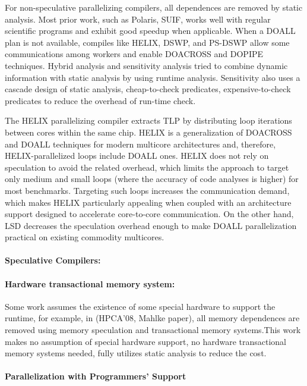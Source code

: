 For non-speculative parallelizing compilers, all dependences are removed by
static analysis. Most prior work, such as Polaris, SUIF, works well with regular
scientific programs and exhibit good speedup when applicable. When a DOALL plan
is not available, compiles like HELIX, DSWP, and PS-DSWP allow some
communications among workers and enable DOACROSS and DOPIPE techniques. Hybrid
analysis and sensitivity analysis tried to combine dynamic information with
static analysis by using runtime analysis. Sensitivity also uses a cascade
design of static analysis, cheap-to-check predicates, expensive-to-check
predicates to reduce the overhead of run-time check.


The HELIX parallelizing compiler extracts TLP by distributing loop iterations between cores within the same chip.
HELIX is a generalization of DOACROSS and DOALL techniques for modern multicore architectures and, therefore, HELIX-parallelized loops include DOALL ones.
HELIX does not rely on speculation to avoid the related overhead, which limits the approach to target only medium and small loops (where the accuracy of code analyses is higher) for most benchmarks.
Targeting such loops increases the communication demand, which makes HELIX particularly appealing when coupled with an architecture support designed to accelerate core-to-core communication.
On the other hand, LSD decreases the speculation overhead enough to make DOALL parallelization practical on existing commodity multicores.


\paragraph{Speculative Compilers:}

\paragraph{Hardware transactional memory system:}

Some work assumes the existence of some special hardware to support the runtime,
for example, in (HPCA’08, Mahlke paper), all memory dependences are removed
using memory speculation and transactional memory systems.This work makes no
assumption of special hardware support, no hardware transactional memory systems
needed, fully utilizes static analysis to reduce the cost.

\paragraph{Parallelization with Programmers' Support}

